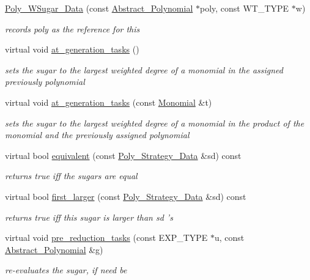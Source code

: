 \begin{DoxyCompactItemize}
\item 
\hyperlink{group__strategygroup_a1f64d0099befd970d362c0166be1b652}{Poly\+\_\+\+W\+Sugar\+\_\+\+Data} (const \hyperlink{group__polygroup_class_abstract___polynomial}{Abstract\+\_\+\+Polynomial} $\ast$poly, const W\+T\+\_\+\+T\+Y\+PE $\ast$w)
\begin{DoxyCompactList}\small\item\em records {\ttfamily poly} as the reference for {\ttfamily this} \end{DoxyCompactList}\item 
\mbox{\label{group__strategygroup_ac07ee9ee15bd97e5e8befb3f6cec3929}} 
virtual void \hyperlink{group__strategygroup_ac07ee9ee15bd97e5e8befb3f6cec3929}{at\+\_\+generation\+\_\+tasks} ()
\begin{DoxyCompactList}\small\item\em sets the sugar to the largest weighted degree of a monomial in the assigned previously polynomial \end{DoxyCompactList}\item 
virtual void \hyperlink{group__strategygroup_ac58bd8d30e7e10dbbe8e86b1d9d04376}{at\+\_\+generation\+\_\+tasks} (const \hyperlink{group__polygroup_class_monomial}{Monomial} \&t)
\begin{DoxyCompactList}\small\item\em sets the sugar to the largest weighted degree of a monomial in the product of the monomial and the previously assigned polynomial \end{DoxyCompactList}\item 
virtual bool \hyperlink{group__strategygroup_a50b4b29d57fb8bed56174733207369dd}{equivalent} (const \hyperlink{group__strategygroup_class_poly___strategy___data}{Poly\+\_\+\+Strategy\+\_\+\+Data} \&sd) const
\begin{DoxyCompactList}\small\item\em returns {\ttfamily true} iff the sugars are equal \end{DoxyCompactList}\item 
virtual bool \hyperlink{group__strategygroup_a83a899b8195beed8d72d692fe4c228a3}{first\+\_\+larger} (const \hyperlink{group__strategygroup_class_poly___strategy___data}{Poly\+\_\+\+Strategy\+\_\+\+Data} \&sd) const
\begin{DoxyCompactList}\small\item\em returns {\ttfamily true} iff {\ttfamily this} sugar is larger than {\ttfamily sd} 's \end{DoxyCompactList}\item 
virtual void \hyperlink{group__strategygroup_a4a34039eb50a2294d2aaf6245c1833b8}{pre\+\_\+reduction\+\_\+tasks} (const E\+X\+P\+\_\+\+T\+Y\+PE $\ast$u, const \hyperlink{group__polygroup_class_abstract___polynomial}{Abstract\+\_\+\+Polynomial} \&g)
\begin{DoxyCompactList}\small\item\em re-\/evaluates the sugar, if need be \end{DoxyCompactList}\end{DoxyCompactItemize}
